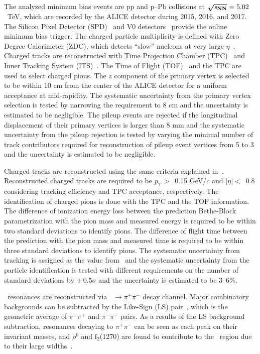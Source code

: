 \documentclass[ALICE,manyauthors]{cernphprep}
\begin{document}
The analyzed minimum bias events are pp and p--Pb collisions at $\boldsymbol{\sqrt{{\textit s_{\mathrm{NN}}}}}=5.02$~TeV, which are recorded by the ALICE detector during 2015, 2016, and 2017. The Silicon Pixel Detector (SPD)~\cite{Cali:2008zz} and V0 detectors~\cite{ALICE:2013axi} provide the online minimum bias trigger. The charged particle multiplicity is defined with Zero Degree Calorimeter (ZDC), which detects ``slow'' nucleons at very large $\eta$~\cite{Cortese:2019nnv}. Charged tracks are reconstructed with Time Projection Chamber (TPC)~\cite{Alme:2010ke} and Inner Tracking System (ITS)~\cite{ALICE:2010tia}. The Time of Flight (TOF)~\cite{Jacazio:2018slq} and the TPC are used to select charged pions. The $z$ component of the primary vertex is selected to be within 10 cm from the center of the ALICE detector for a uniform acceptance at mid-rapidity. The systematic uncertainty from the primary vertex selection is tested by narrowing the requirement to 8 cm and the uncertainty is estimated to be negligible. The pileup events are rejected if the longitudinal displacement of their primary vertices is larger than 8 mm and the systematic uncertainty from the pileup rejection is tested by varying the minimal number of track contributors required for reconstruction of pileup event vertices from 5 to 3 and the uncertainty is estimated to be negligible.

Charged tracks are reconstructed using the same criteria explained in~\cite{ALICE:2013wgn}. Reconstructed charged tracks are required to be $p_{\mathrm{T}}>$~0.15 GeV/$c$ and $|\eta|<$~0.8 considering tracking efficiency and TPC acceptance, respectively. The identification of charged pions is done with the TPC and the TOF information. The difference of ionization energy loss between the prediction Bethe-Block parametrization with the pion mass and measured energy is required to be within two standard deviations to identify pions. The difference of flight time between the prediction with the pion mass and measured time is required to be within three standard deviations to identify pions. The systematic uncertainty from tracking is assigned as the value from~\cite{ALICE:2013wgn} and the systematic uncertainty from the particle identification is tested with different requirements on the number of standard deviations by $\pm\,0.5\sigma$ and the uncertainty is estimated to be 3--6\%.

\fzero~resonances are reconstructed via \fzero~$\rightarrow \pi^{+}\pi^{-}$ decay channel. Major combinatory backgrounds can be subtracted by the Like-Sign (LS) pair~\cite{PhysRevD.36.2019}, which is the geometric average of $\pi^{+}\pi^{+}$ and $\pi^{-}\pi^{-}$ pairs. As a results of the LS background subtraction, resonances decaying to $\pi^{+}\pi^{-}$ can be seen as each peak on their invariant masses, and $\rho^{0}$ and $\mathrm{f}_{2}$(1270) are found to contribute to the \fzero~region due to their large widths~\cite{ParticleDataGroup:2020ssz}.
\end{document}
